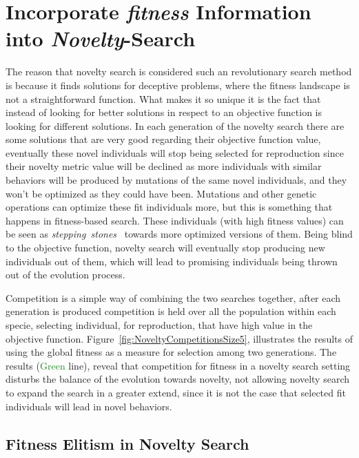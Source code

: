 \section{Incorporate \emph{fitness} Information into \emph{Novelty}-Search}

The reason that novelty search is considered such an revolutionary search method is because it finds solutions for deceptive problems, where the fitness landscape is not a straightforward function. What makes it so unique it is the fact that instead of looking for better solutions in respect to an objective function is looking for different solutions. In each generation of the novelty search there are some solutions that are very good regarding their objective function value, eventually these novel individuals will stop being selected for reproduction since their novelty metric value will be declined as more individuals with similar behaviors will be produced by mutations of the same novel individuals, and they won't be optimized as they could have been. Mutations and other genetic operations can optimize these fit individuals more, but this is something that happens in fitness-based search. These individuals (with high fitness values) can be seen as \emph{stepping~stones}~\cite{lehman2011abandoning} towards more optimized versions of them. Being blind to the objective function, novelty search will eventually stop producing new individuals out of them, which will lead to promising individuals being thrown out of the evolution process. 

Competition is a simple way of combining the two searches together, after each generation is produced competition is held over all the population within each specie, selecting individual, for reproduction, that have high value in the objective function. Figure~\ref{fig:NoveltyCompetitionsSize5}, illustrates the results of using the global fitness as a measure for selection among two generations. The results (\textcolor{ForestGreen}{Green} line), reveal that competition for fitness in a novelty search setting disturbs the balance of the evolution towards novelty, not allowing novelty search to expand the search in a greater extend, since it is not the case that selected fit individuals will lead in novel behaviors. 






\subsection*{Fitness Elitism in Novelty Search}

